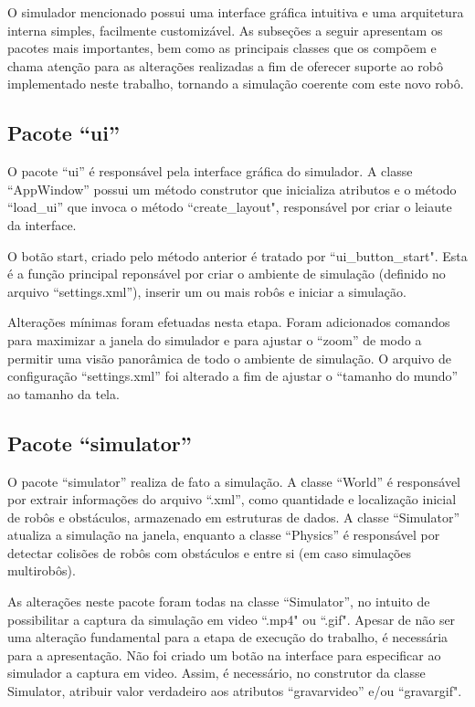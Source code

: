 O simulador mencionado possui uma interface gráfica intuitiva e uma arquitetura 
interna simples, facilmente customizável. As subseções a seguir apresentam os 
pacotes mais importantes, bem como as principais classes que os compõem e chama 
atenção para as alterações realizadas a fim de oferecer suporte ao robô implementado
neste trabalho, tornando a simulação coerente com este novo robô.

	\subsection{Pacote ``ui''}
	
	O pacote ``ui'' é responsável pela interface gráfica do simulador. A classe
	``AppWindow'' possui um método construtor que inicializa atributos e o
	método ``load\_ui'' que invoca o método ``create\_layout", responsável por
	criar o leiaute da interface.
	
	O botão start, criado pelo método anterior é tratado por ``ui\_button\_start".
	Esta é a função principal reponsável por criar o ambiente de simulação
	(definido no arquivo ``settings.xml''), inserir um ou mais robôs e iniciar a
	simulação.
	
	Alterações mínimas foram efetuadas nesta etapa. Foram adicionados comandos para
	maximizar a janela do simulador e para ajustar o ``zoom'' de modo a permitir uma
	visão panorâmica de todo o ambiente de simulação. O arquivo de configuração
	``settings.xml'' foi alterado a fim de ajustar o ``tamanho do mundo'' ao
	tamanho da	tela.
	
	\subsection{Pacote ``simulator''}
	
	O pacote ``simulator'' realiza de fato a simulação. A classe ``World'' é
	responsável por extrair informações do arquivo ``.xml'', como quantidade e
	localização inicial de robôs e obstáculos, armazenado em estruturas de dados.
	A classe ``Simulator'' atualiza a simulação na janela, enquanto a
	classe ``Physics'' é responsável por detectar colisões de robôs com obstáculos
	e entre si (em caso simulações multirobôs). 
	
	As alterações neste pacote foram todas na classe ``Simulator'', no intuito
	de possibilitar a captura da simulação em video ``.mp4" ou ``.gif". Apesar de
	não ser uma alteração fundamental para a etapa de execução do trabalho, é
	necessária para a apresentação. Não foi criado um botão na interface para
	especificar ao simulador a captura em video. Assim, é necessário, no
	construtor da classe Simulator, atribuir valor verdadeiro aos atributos
	``gravarvideo'' e/ou ``gravargif". 
	
